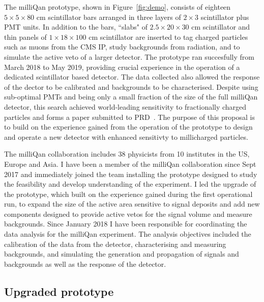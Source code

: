 \documentclass[11pt]{article}
\theoremstyle{plain} \numberwithin{equation}{section}
\theoremstyle{definition}
\begin{document}
The milliQan prototype, shown in Figure~\ref{fig:demo}, consists of eighteen 
$5\times5\times80$ cm scintillator bars arranged in three layers 
of $2\times3$ scintillator plus PMT units. 
In addition to the bars, ``slabs" of $2.5 \times 20 \times 30$ cm scintillator 
and thin panels of $1 \times 18 \times 100$ cm scintillator are inserted 
to tag charged particles such as muons from the CMS IP, 
study backgrounds from radiation, and to simulate the active veto of a larger detector.
The prototype ran succesfully from March 2018 to May 2019, providing crucial
experience in the operation of a dedicated scintillator based detector. The data collected
also allowed the response of the dector to be calibrated and backgrounds to 
be characterised. Despite using sub-optimal PMTs 
and being only a small fraction of the size of the full milliQan detector,
this search achieved world-leading sensitivity to fractionally charged particles and forms
a paper submitted to PRD~\cite{ball2020search}. The purpose of this proposal is to build on
the experience gained from the operation of the prototype to design and operate a new detector
with enhanced sensitivty to millicharged particles.

The milliQan collaboration includes 38 physicists from 10 institutes in the US, 
Europe and Asia. I have been a member of the milliQan collaboration since Sept 2017 and immediately joined the
team installing the prototype designed to study the feasibility and
develop understanding of the experiment. I led the upgrade of the prototype, which built on the experience 
gained during the first operational run, to expand the size of the active area
sensitive to signal deposits and add new components designed to provide
active vetos for the signal volume and measure backgrounds. Since January 2018 
I have been responsible for coordinating the data analysis for the milliQan experiment.
The analysis objectives included the calibration of the data from the detector,
characterising and measuring backgrounds, and simulating the generation and propagation of 
signals and backgrounds as well as the response of the detector.

\subsection*{Upgraded prototype}
\end{document}
